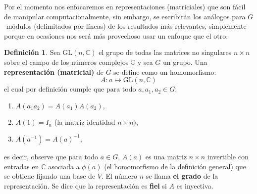 \documentclass[12pt]{book}
\theoremstyle{definition}
\newtheorem{definition}[theorem]{Definición}
\newcounter{in}
\newcounter{ini}
\begin{document}
Por el momento nos enfocaremos en representaciones (matriciales) que
son fácil de manipular computacionalmente, sin embargo, se escribirán
los análogos para $G$-módulos (delimitados por líneas) de los
resultados más relevantes, simplemente porque en ocasiones nos será
más provechoso usar un enfoque que el otro.
\begin{definition}
  Sea $ \mathrm{GL}(n,\mathbb{C})$ el grupo de todas las matrices no
singulares $n\times n$ sobre el campo de los números complejos
$\mathbb{C}$ y sea $G$ un grupo. Una \textbf{representación
(matricial)} de $G$ se define como un homomorfismo:
\begin{equation*}
  A \colon a \mapsto \mathrm{GL}(n,\mathbb{C})
\end{equation*}
el cual por definición cumple que para todo $a, a_1,a_2 \in G$:
\begin{enumerate}
\item $A\left(a_1a_2\right)=A\left(a_1\right)A\left(a_2\right)$,
\item $A\left(1\right)=I_{n}$ (la matriz identidad $n\times n$),
\item $A\left(a^{-1}\right)=A\left(a\right)^{-1}$,
\end{enumerate}
es decir, observe que para todo $a \in G$, $A(a)$ es una matriz
$n \times n$ invertible con entradas en $\mathbb{C}$ asociada a $\phi(a)$ (el homomorfismo de la definición general) que se obtiene fijando una base de $V$. El número $n$ se
llama \textbf{el grado} de la representación. Se dice que la
representación es \textbf{fiel} si $A$ es inyectiva.
\end{definition} 
\end{document}
